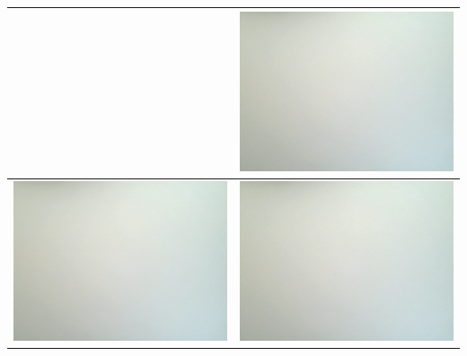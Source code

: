 \begin{tabular}{|c|c|}
 & 
\includegraphics[scale=0.27]{weissbilder/weissbild_3.png}
 \\ 
\hline 
\includegraphics[scale=0.27]{weissbilder/weissbild_4.png}
 & 
\includegraphics[scale=0.27]{weissbilder/weissbild_5.png}

\end{tabular}
